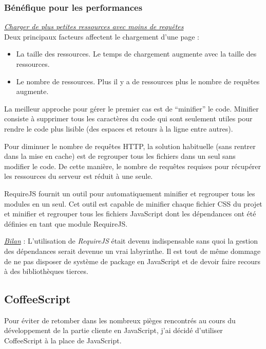 \subsubsection{Bénéfique pour les performances}

\textit{\underline{Charger de plus petites ressources avec moins de requêtes}}\\

Deux principaux facteurs affectent le chargement d'une page :
\begin{itemize}
\item La taille des ressources. Le temps de chargement augmente avec la taille
  des ressources.
\item Le nombre de ressources. Plus il y a de ressources plus le nombre de
  requêtes augmente.
\end{itemize}

La meilleur approche pour gérer le premier cas est de ``minifier'' le code.
Minifier consiste à supprimer tous les caractères du code qui sont seulement
utiles pour rendre le code plus lisible (des espaces et retours à la ligne
entre autres).

Pour diminuer le nombre de requêtes HTTP, la solution habituelle (sans rentrer
dans la mise en cache) est de regrouper tous les fichiers dans un seul sans
modifier le code. De cette manière, le nombre de requêtes requises pour
récupérer les ressources du serveur est réduit à une seule.

RequireJS fournit un outil pour automatiquement minifier et
regrouper tous les modules en un seul. Cet outil est capable de minifier chaque
fichier CSS du projet et minifier et regrouper tous les fichiers JavaScript dont
les dépendances ont été définies en tant que module RequireJS.

\underline{\textit{Bilan}} : L'utilisation de \textit{RequireJS} était devenu
indispensable sans quoi la gestion des dépendances serait devenue un vrai
labyrinthe. Il est tout de même dommage de ne pas disposer de système de package
en JavaScript et de devoir faire recours à des bibliothèques tierces.

\subsection{CoffeeScript}

Pour éviter de retomber dans les nombreux pièges rencontrés au cours du
développement de la partie cliente en JavaScript, j'ai décidé d'utiliser
CoffeeScript à la place de JavaScript.


